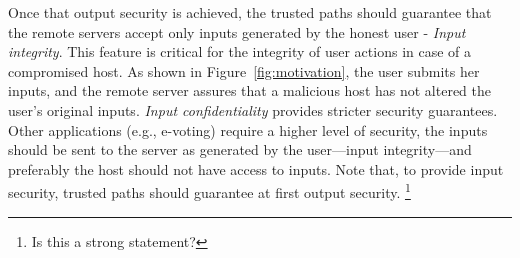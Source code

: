 Once that output security is achieved, the trusted paths should guarantee that the remote servers accept only inputs generated by the honest user - \emph{Input integrity}. This feature is critical for the integrity of user actions in case of a compromised host. As shown in Figure~\ref{fig:motivation}, the user submits her inputs, and the remote server assures that a malicious host has not altered the user's original inputs. \emph{Input confidentiality} provides stricter security guarantees. Other applications (e.g., e-voting) require a higher level of security, the inputs should be sent to the server as generated by the user---input integrity---and preferably the host should not have access to inputs. Note that, to provide input security, trusted paths should guarantee at first output security. \footnote{Is this a strong statement?}




